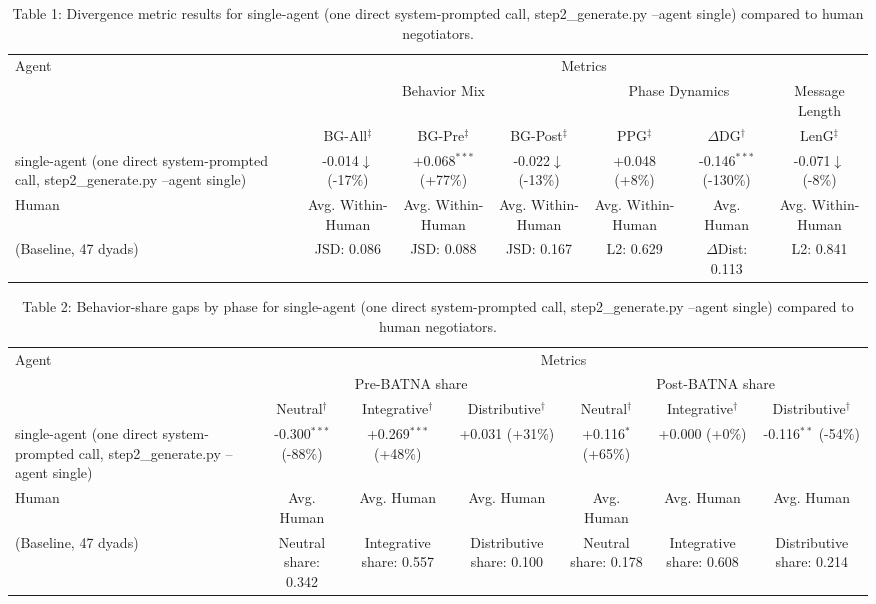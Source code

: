 \begin{table}[t]
\centering
\begin{tabular}{lcccccc}
\toprule
\multirow{3}{*}{Agent} & \multicolumn{6}{c}{Metrics} \\
\cmidrule(lr){2-7}
 & \multicolumn{3}{c}{Behavior Mix} & \multicolumn{2}{c}{Phase Dynamics} & \multicolumn{1}{c}{Message Length} \\
\cmidrule(lr){2-4} \cmidrule(lr){5-6} \cmidrule(lr){7-7}
 & BG-All$^\ddagger$ & BG-Pre$^\ddagger$ & BG-Post$^\ddagger$ & PPG$^\ddagger$ & $\Delta$DG$^\dagger$ & LenG$^\ddagger$ \\
\midrule
single-agent (one direct system-prompted call, step2_generate.py --agent single) & -0.014$\downarrow$ (-17\%) & +0.068$^{***}$ (+77\%) & -0.022$\downarrow$ (-13\%) & +0.048 (+8\%) & -0.146$^{***}$ (-130\%) & -0.071$\downarrow$ (-8\%) \\
\midrule
Human & Avg. Within-Human & Avg. Within-Human & Avg. Within-Human & Avg. Within-Human & Avg. Human & Avg. Within-Human \\
(Baseline, 47 dyads) & JSD: 0.086 & JSD: 0.088 & JSD: 0.167 & L2: 0.629 & $\Delta$Dist: 0.113 & L2: 0.841 \\
\bottomrule
\end{tabular}
\caption{Table 1: Divergence metric results for single-agent (one direct system-prompted call, step2_generate.py --agent single) compared to human negotiators.}
\end{table}

\begin{table}[t]
\centering
\begin{tabular}{lcccccc}
\toprule
\multirow{3}{*}{Agent} & \multicolumn{6}{c}{Metrics} \\
\cmidrule(lr){2-7}
 & \multicolumn{3}{c}{Pre-BATNA share} & \multicolumn{3}{c}{Post-BATNA share} \\
\cmidrule(lr){2-4} \cmidrule(lr){5-7}
 & Neutral$^\dagger$ & Integrative$^\dagger$ & Distributive$^\dagger$ & Neutral$^\dagger$ & Integrative$^\dagger$ & Distributive$^\dagger$ \\
\midrule
single-agent (one direct system-prompted call, step2_generate.py --agent single) & -0.300$^{***}$ (-88\%) & +0.269$^{***}$ (+48\%) & +0.031 (+31\%) & +0.116$^{*}$ (+65\%) & +0.000 (+0\%) & -0.116$^{**}$ (-54\%) \\
\midrule
Human & Avg. Human & Avg. Human & Avg. Human & Avg. Human & Avg. Human & Avg. Human \\
(Baseline, 47 dyads) & Neutral share: 0.342 & Integrative share: 0.557 & Distributive share: 0.100 & Neutral share: 0.178 & Integrative share: 0.608 & Distributive share: 0.214 \\
\bottomrule
\end{tabular}
\caption{Table 2: Behavior-share gaps by phase for single-agent (one direct system-prompted call, step2_generate.py --agent single) compared to human negotiators.}
\end{table}
